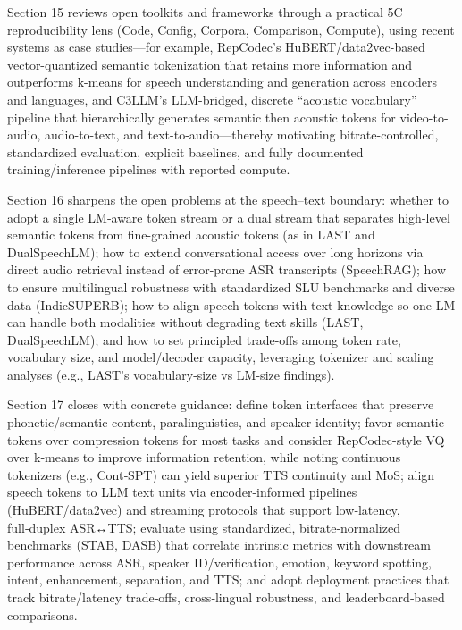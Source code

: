 \documentclass{article}
\begin{document}
Section 15 reviews open toolkits and frameworks through a practical 5C reproducibility lens (Code, Config, Corpora, Comparison, Compute), using recent systems as case studies—for example, RepCodec’s HuBERT/data2vec-based vector-quantized semantic tokenization that retains more information and outperforms k-means for speech understanding and generation across encoders and languages, and C3LLM’s LLM-bridged, discrete “acoustic vocabulary” pipeline that hierarchically generates semantic then acoustic tokens for video-to-audio, audio-to-text, and text-to-audio—thereby motivating bitrate-controlled, standardized evaluation, explicit baselines, and fully documented training/inference pipelines with reported compute. \cite{wang2024c3llmconditionalmultimodalcontentgenerat,huang2024repcodecspeechrepresentationcodectokeniz} 



Section 16 sharpens the open problems at the speech–text boundary: whether to adopt a single LM-aware token stream or a dual stream that separates high-level semantic tokens from fine-grained acoustic tokens (as in LAST and DualSpeechLM); how to extend conversational access over long horizons via direct audio retrieval instead of error-prone ASR transcripts (SpeechRAG); how to ensure multilingual robustness with standardized SLU benchmarks and diverse data (IndicSUPERB); how to align speech tokens with text knowledge so one LM can handle both modalities without degrading text skills (LAST, DualSpeechLM); and how to set principled trade-offs among token rate, vocabulary size, and model/decoder capacity, leveraging tokenizer and scaling analyses (e.g., LAST’s vocabulary-size vs LM-size findings). \cite{min2025speechretrievalaugmentedgenerationwithou,turetzky2024lastlanguagemodelawarespeechtokenization,wang2025dualspeechlmtowardsunifiedspeechundersta,entry2025indicsuperbspeechprocessinguniversalperf} 



Section 17 closes with concrete guidance: define token interfaces that preserve phonetic/semantic content, paralinguistics, and speaker identity; favor semantic tokens over compression tokens for most tasks and consider RepCodec-style VQ over k‑means to improve information retention, while noting continuous tokenizers (e.g., Cont‑SPT) can yield superior TTS continuity and MoS; align speech tokens to LLM text units via encoder-informed pipelines (HuBERT/data2vec) and streaming protocols that support low‑latency, full‑duplex ASR↔TTS; evaluate using standardized, bitrate‑normalized benchmarks (STAB, DASB) that correlate intrinsic metrics with downstream performance across ASR, speaker ID/verification, emotion, keyword spotting, intent, enhancement, separation, and TTS; and adopt deployment practices that track bitrate/latency trade‑offs, cross‑lingual robustness, and leaderboard‑based comparisons. \cite{li2025continuousspeechtokenizertext,mousavi2024dasbdiscreteaudiospeechbenchmark,vashishth2024stabspeechtokenizerassessmentbenchmark,huang2024repcodecspeechrepresentationcodectokeniz}
\end{document}
